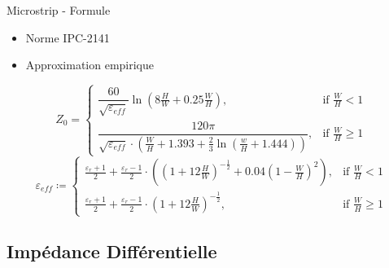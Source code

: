 \begin{frame}{Microstrip - Formule}
    \begin{itemize}
        \item Norme IPC-2141
        \item Approximation empirique
    \end{itemize}
    \pause
    \begin{center}
        \[
            Z_0 =
            \begin{cases} 
                \dfrac{60}{\sqrt{\varepsilon_{eff}}}\ln\left(8\frac{H}{W} + 0.25\frac{W}{H}\right), & \text{if } \frac{W}{H} < 1 \\
                \dfrac{120 \pi}{\sqrt{\varepsilon_{eff}} \cdot \left(\frac{W}{H} + 1.393 + \frac{2}{3}\ln\left(\frac{w}{H} + 1.444\right)\right)}, & \text{if } \frac{W}{H} \geq 1
            \end{cases}
        \]
        \[
            \varepsilon_{eff} \coloneqq
            \begin{cases} 
                \frac{\varepsilon_r + 1}{2} + \frac{\varepsilon_r - 1}{2} \cdot \left(\left(1 + 12 \frac{H}{W}\right)^{-\frac{1}{2}} + 0.04\left(1 - \frac{W}{H}\right)^2\right), & \text{if } \frac{W}{H} < 1 \\
                \frac{\varepsilon_r + 1}{2} + \frac{\varepsilon_r - 1}{2} \cdot \left(1 + 12 \frac{H}{W}\right)^{-\frac{1}{2}}, & \text{if } \frac{W}{H} \geq 1
            \end{cases}
        \]
    \end{center}
\end{frame}

\subsection{Impédance Différentielle}